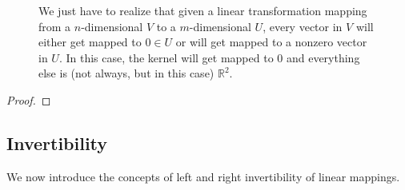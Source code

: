 \begin{theorem}
\begin{figure}[H]
      \caption{We just have to realize that given a linear transformation mapping from a $n$-dimensional $V$ to a $m$-dimensional $U$, every vector in $V$ will either get mapped to $0 \in U$ or will get mapped to a nonzero vector in $U$. In this case, the kernel will get mapped to $0$ and everything else is (not always, but in this case) $\mathbb{R}^2$. } 
      \label{fig:rank_nullity}
    \end{figure}
  \end{theorem}
  \begin{proof}
    
  \end{proof}

\subsection{Invertibility} 

  We now introduce the concepts of left and right invertibility of linear mappings. 

